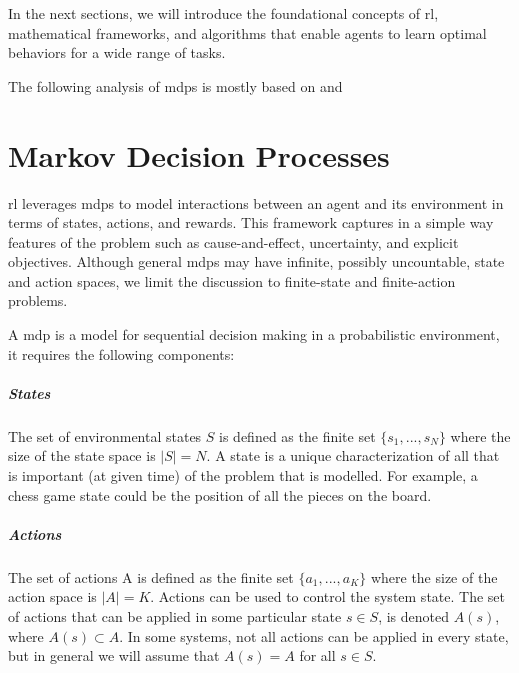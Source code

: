 \documentclass[a4paper,11pt]{report}
\theoremstyle{definition}
\theoremstyle{plain}
\theoremstyle{remark}  %
\begin{document}

% 
% 
% 
% 

% 
% 
% 
% 
% 

In the next sections, we will introduce the foundational concepts of \gls{rl}, 
mathematical frameworks, and algorithms that enable agents to learn optimal behaviors for 
a wide range of tasks.

The following analysis of \gls{mdp}s is mostly based on \cite{d1afac99aad548188c9d47063c7109df} and \cite{Sutton1998}


\chapter{Markov Decision Processes}

\gls{rl} leverages \gls{mdp}s to model interactions between 
an agent and its environment in terms of states, actions, and rewards. 
This framework captures in a simple way features of the problem such as cause-and-effect, 
uncertainty, and explicit objectives.
Although general \gls{mdp}s may have infinite, possibly uncountable, state and action
spaces, we limit the discussion to finite-state and finite-action problems.

A \gls{mdp} is a model for sequential decision making in a probabilistic environment, it requires
the following components:

\paragraph{States}
The set of environmental states $S$ is defined as the finite set $\{s_1 , . . . , s_N \}$ where the
size of the state space is $|S| = N$. A state is a unique characterization of all
that is important (at given time) of the problem that is modelled. For example, a chess game state 
could be the position of all the pieces on the board.

\paragraph{Actions}
The set of actions A is defined as the finite set $\{a_1 , . . . , a_K \}$ where the size of the
action space is $|A| = K$. Actions can be used to control the system state.
The set of actions that can be applied in some particular state $s \in S$, is denoted $A(s)$,
where $A(s) \subset A$. In some systems, not all actions can be applied in every state, but in
general we will assume that $A(s) = A$ for all $s \in S$.
\end{document}
